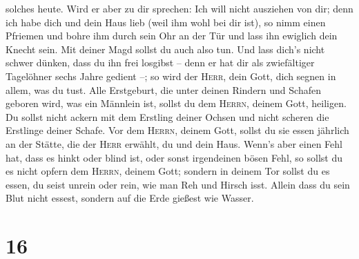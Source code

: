 solches heute.  Wird er aber zu dir sprechen: Ich will
nicht ausziehen von dir; denn ich habe dich und dein Haus lieb (weil ihm
wohl bei dir ist),  so nimm einen Pfriemen und bohre ihm
durch sein Ohr an der Tür und lass ihn ewiglich dein Knecht sein. Mit
deiner Magd sollst du auch also tun.  Und lass dich's
nicht schwer dünken, dass du ihn frei losgibst -- denn er hat dir als
zwiefältiger Tagelöhner sechs Jahre gedient --; so wird der
\textsc{Herr}, dein Gott, dich segnen in allem, was du tust.
 Alle Erstgeburt, die unter deinen Rindern und Schafen
geboren wird, was ein Männlein ist, sollst du dem \textsc{Herrn}, deinem
Gott, heiligen. Du sollst nicht ackern mit dem Erstling deiner Ochsen
und nicht scheren die Erstlinge deiner Schafe.  Vor dem
\textsc{Herrn}, deinem Gott, sollst du sie essen jährlich an der Stätte,
die der \textsc{Herr} erwählt, du und dein Haus.  Wenn's
aber einen Fehl hat, dass es hinkt oder blind ist, oder sonst
irgendeinen bösen Fehl, so sollst du es nicht opfern dem \textsc{Herrn},
deinem Gott;  sondern in deinem Tor sollst du es essen,
du seist unrein oder rein, wie man Reh und Hirsch isst. 
Allein dass du sein Blut nicht essest, sondern auf die Erde gießest wie
Wasser.

\hypertarget{section-15}{%
\section{16}\label{section-15}}


